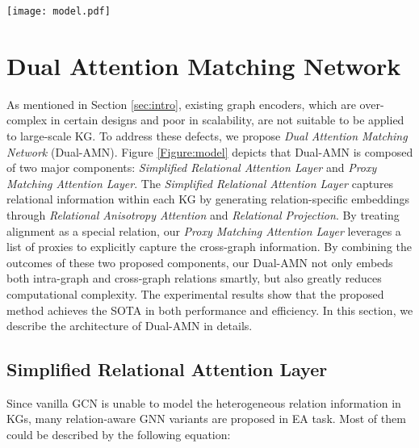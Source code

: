 \documentclass[sigconf]{acmart}
\begin{document}
\begin{figure*}[t]
  \centering
  \texttt{[image: model.pdf]}
  \caption{The architecture illustration of \emph{Dual Attention Matching Network} (Dual-AMN), composing of \emph{Simplified Relational Attention Layer} and \emph{Proxy Matching Attention Layer}.}\label{Figure:model}
\end{figure*}

\section{Dual Attention Matching Network}
\label{sec:model}
As mentioned in Section \ref{sec:intro}, existing graph encoders, which are over-complex in certain designs and poor in scalability, are not suitable to be applied to large-scale KG.
To address these defects, we propose \emph{Dual Attention Matching Network} (Dual-AMN).
Figure \ref{Figure:model} depicts that Dual-AMN is composed of two major components: \emph{Simplified Relational Attention Layer} and \emph{Proxy Matching Attention Layer}.
The \emph{Simplified Relational Attention Layer} captures relational information within each KG by generating relation-specific embeddings through \emph{Relational Anisotropy Attention} and \emph{Relational Projection}.
By treating alignment as a special relation, our \emph{Proxy Matching Attention Layer} leverages a list of proxies to explicitly capture the cross-graph information.
By combining the outcomes of these two proposed components, our Dual-AMN not only embeds both intra-graph and cross-graph relations smartly, but also greatly reduces computational complexity.
The experimental results show that the proposed method achieves the SOTA in both performance and efficiency.
In this section, we describe the architecture of Dual-AMN in details.


\subsection{Simplified Relational Attention Layer}
Since vanilla GCN is unable to model the heterogeneous relation information in KGs, many relation-aware GNN variants are proposed in EA task.
Most of them could be described by the following equation:
\end{document}
